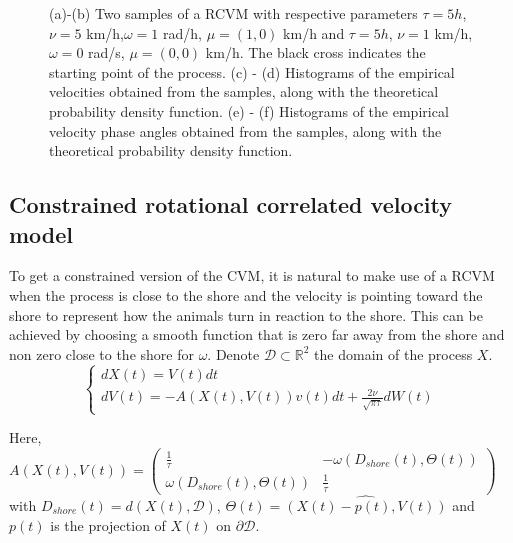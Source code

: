 \documentclass[11pt]{article}
\newcommand {\R}{\mathbb{R}}
\newcommand {\1}{\mathbb{1}}
\begin{document}
\begin{figure}[H]
\begin{subfigure}{0.48\textwidth}
	\caption{}
\end{subfigure}
	\caption{(a)-(b) Two samples of a RCVM with respective parameters $\tau=5 h$, $\nu=5$ km/h,$\omega=1$ rad/h, $\mu=(1,0)$ km/h  and $\tau=5 h$, $\nu=1$ km/h,$\omega=0$ rad/s, $\mu=(0,0)$ km/h. The black cross indicates the starting point of the process. (c) - (d) Histograms of the empirical velocities obtained from the samples, along with the theoretical probability density function. (e) - (f) Histograms of the empirical velocity phase angles obtained from the samples, along with the theoretical probability density function. }
	\label{fig: sample RACVM}
\end{figure}

\subsection{Constrained rotational correlated velocity model}
\label{section: CRCVM}

To get a constrained version of the CVM, it is natural to make use of a RCVM when the process is close to the shore and the velocity is pointing toward the shore to represent how the animals turn in reaction to the shore.
This can be achieved by choosing a smooth function that is zero far away from the shore and non zero close to the shore for $\omega$.
Denote $\mathcal{D} \subset \R^2$ the domain of the process $X$.
\begin{equation} \left\{
	\begin{array}{l}
		dX(t)=V(t) dt \\
		dV(t)=-A(X(t),V(t))v(t)dt+\frac{2\nu}{\sqrt{\pi \tau}} dW(t) 
	
	\end{array}
	\right.
	\label{eq: CRCVM equation}
\end{equation}

Here, $A(X(t),V(t))=\begin{pmatrix} 
	\frac{1}{\tau} & -\omega(D_{shore}(t),\Theta(t)) \\
	\omega(D_{shore}(t),\Theta(t)) & \frac{1}{\tau}
\end{pmatrix}$
with $D_{shore}(t)=d(X(t),\mathcal{D})$,
 $\Theta(t)=\widehat{(X(t)-p(t),V(t))}$ and $p(t)$ is the projection of $X(t)$ on $\partial \mathcal{D}$.
 
\end{document}
